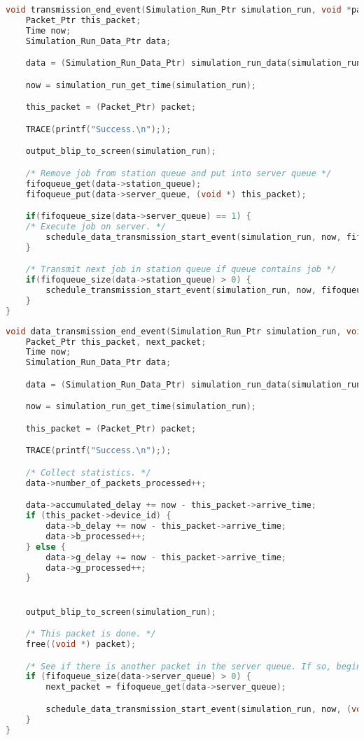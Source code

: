 \documentclass[12pt]{article}
\begin{document}
\begin{lstlisting}[language=c,caption=Station Transmission Event, label=list:station]
void transmission_end_event(Simulation_Run_Ptr simulation_run, void *packet) {
    Packet_Ptr this_packet;
    Time now;
    Simulation_Run_Data_Ptr data;

    data = (Simulation_Run_Data_Ptr) simulation_run_data(simulation_run);

    now = simulation_run_get_time(simulation_run);

    this_packet = (Packet_Ptr) packet;

    TRACE(printf("Success.\n"););

    output_blip_to_screen(simulation_run);

    /* Remove job from station queue and put into server queue */
    fifoqueue_get(data->station_queue);
    fifoqueue_put(data->server_queue, (void *) this_packet);

    if(fifoqueue_size(data->server_queue) == 1) {
    /* Execute job on server. */
        schedule_data_transmission_start_event(simulation_run, now, fifoqueue_get(data->server_queue));
    }

    /* Transmit next job in station queue if queue contains job */
    if(fifoqueue_size(data->station_queue) > 0) {
        schedule_transmission_start_event(simulation_run, now, fifoqueue_see_front(data->station_queue));
    }
}
\end{lstlisting}

\begin{lstlisting}[language=c,caption=Server Execution Event, label=list:server]
void data_transmission_end_event(Simulation_Run_Ptr simulation_run, void *packet) {
	Packet_Ptr this_packet, next_packet;
	Time now;
	Simulation_Run_Data_Ptr data;

	data = (Simulation_Run_Data_Ptr) simulation_run_data(simulation_run);

	now = simulation_run_get_time(simulation_run);

	this_packet = (Packet_Ptr) packet;

	TRACE(printf("Success.\n"););

	/* Collect statistics. */
	data->number_of_packets_processed++;

	data->accumulated_delay += now - this_packet->arrive_time;
	if (this_packet->device_id) {
		data->b_delay += now - this_packet->arrive_time;
		data->b_processed++;
	} else {
		data->g_delay += now - this_packet->arrive_time;
		data->g_processed++;
	}


	output_blip_to_screen(simulation_run);

	/* This packet is done. */
	free((void *) packet);

	/* See if there is another packet in the server queue. If so, begin execution. */
	if (fifoqueue_size(data->server_queue) > 0) {
		next_packet = fifoqueue_get(data->server_queue);

		schedule_data_transmission_start_event(simulation_run, now, (void *) next_packet);
	}
}	
\end{lstlisting}
\end{document}
